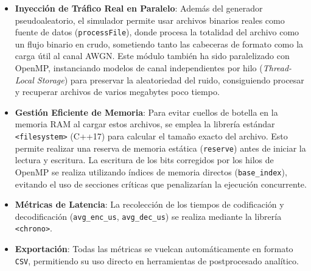 \begin{itemize}
    \item \textbf{Inyección de Tráfico Real en Paralelo}: Además del generador pseudoaleatorio, el simulador permite usar archivos binarios reales como fuente de datos (\texttt{processFile}), donde procesa la totalidad del archivo como un flujo binario en crudo, sometiendo tanto las cabeceras de formato como la carga útil al canal AWGN. Este módulo también ha sido paralelizado con OpenMP, instanciando modelos de canal independientes por hilo (\textit{Thread-Local Storage}) para preservar la aleatoriedad del ruido, consiguiendo procesar y recuperar archivos de varios megabytes poco tiempo.
    \item \textbf{Gestión Eficiente de Memoria}: Para evitar cuellos de botella en la memoria RAM al cargar estos archivos, se emplea la librería estándar \texttt{<filesystem>} (C++17) para calcular el tamaño exacto del archivo. Esto permite realizar una reserva de memoria estática (\texttt{reserve}) antes de iniciar la lectura y escritura. La escritura de los bits corregidos por los hilos de OpenMP se realiza utilizando índices de memoria directos (\texttt{base\_index}), evitando el uso de secciones críticas que penalizarían la ejecución concurrente.
    \item \textbf{Métricas de Latencia}: La recolección de los tiempos de codificación y decodificación (\texttt{avg\_enc\_us}, \texttt{avg\_dec\_us}) se realiza mediante la librería \texttt{<chrono>}.
    \item \textbf{Exportación}: Todas las métricas se vuelcan automáticamente en formato \texttt{CSV}, permitiendo su uso directo en herramientas de postprocesado analítico.
\end{itemize}